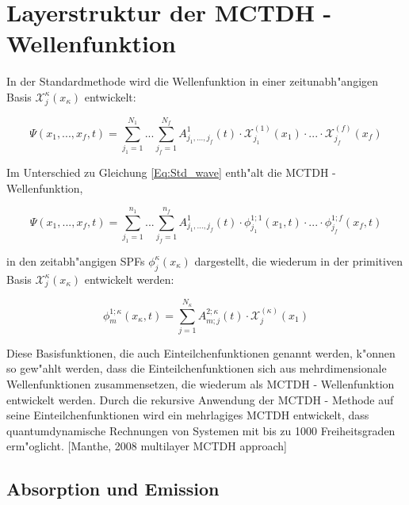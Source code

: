 \section{Layerstruktur der MCTDH - Wellenfunktion}

In der Standardmethode wird die Wellenfunktion in einer zeitunabh"angigen Basis $\mathcal{X}^{\kappa}_{j}(x_{\kappa})$ entwickelt:

 \begin{equation}
 \Psi(x_{1},..., x_{f}, t)=\sum^{N_{1}}_{j_{1}=1} ... \sum^{N_{f}}_{j_{f}=1} A^{1}_{j_{1}, ..., j_{f}}(t)\cdot \mathcal{X}^{(1)}_{j_{1}}(x_{1}) \cdot ... \cdot \mathcal{X}^{(f)}_{j_{f}}(x_{f})
 \label{Eq:Std_wave}
 \end{equation}

Im Unterschied zu Gleichung \ref{Eq:Std_wave} enth"alt die MCTDH - Wellenfunktion,

 \begin{equation}
 \Psi(x_{1},..., x_{f}, t)=\sum^{n_{1}}_{j_{1}=1} ... \sum^{n_{f}}_{j_{f}=1} A^{1}_{j_{1}, ..., j_{f}}(t)
 \cdot \phi^{1;1}_{j_{1}}(x_{1}, t) \cdot ... \cdot \phi^{1;f}_{j_{f}}(x_{f}, t)
 \label{Eq:mctdh_wave}
 \end{equation}

in den zeitabh"angigen SPFs $\phi^{\kappa}_{j}(x_{\kappa})$ dargestellt, die wiederum in der primitiven Basis $\mathcal{X}^{\kappa}_{j}(x_{\kappa})$ entwickelt werden:

\begin{equation}
 \phi^{1;\kappa}_{m} (x_{\kappa}, t)=\sum^{N_{\kappa}}_{j=1} A^{2;\kappa}_{m;j}(t) \cdot \mathcal{X}^{(\kappa)}_{j}(x_{1})
 \label{Eq:Std_wave}
 \end{equation}


Diese Basisfunktionen, die auch Einteilchenfunktionen genannt werden, k"onnen so gew"ahlt werden, dass die Einteilchenfunktionen sich aus mehrdimensionale
Wellenfunktionen zusammensetzen, die wiederum als MCTDH - Wellenfunktion entwickelt werden.
Durch die rekursive Anwendung der MCTDH - Methode auf seine Einteilchenfunktionen wird ein mehrlagiges MCTDH entwickelt, dass quantumdynamische Rechnungen
von Systemen mit bis zu 1000 Freiheitsgraden erm"oglicht. [Manthe, 2008 multilayer MCTDH approach]



 \subsection{Absorption und Emission}
